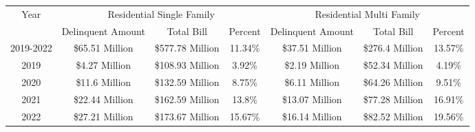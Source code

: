 \begin{tabular}{c|ccc|ccc}
\toprule 
\midrule 
Year & \multicolumn{3}{c}{Residential Single Family} & \multicolumn{3}{c}{Residential Multi Family} \\
 \cmidrule(lr){2-4} \cmidrule(lr){5-7} 
 & Delinquent Amount & Total Bill & Percent & Delinquent Amount & Total Bill & Percent \\
\midrule 
2019-2022 & \$65.51 Million & \$577.78 Million & 11.34\% & \$37.51 Million & \$276.4 Million & 13.57\% \\
2019 & \$4.27 Million & \$108.93 Million & 3.92\% & \$2.19 Million & \$52.34 Million & 4.19\% \\
2020 & \$11.6 Million & \$132.59 Million & 8.75\% & \$6.11 Million & \$64.26 Million & 9.51\% \\
2021 & \$22.44 Million & \$162.59 Million & 13.8\% & \$13.07 Million & \$77.28 Million & 16.91\% \\
2022 & \$27.21 Million & \$173.67 Million & 15.67\% & \$16.14 Million & \$82.52 Million & 19.56\% \\
\midrule 
\bottomrule 
\end{tabular}
